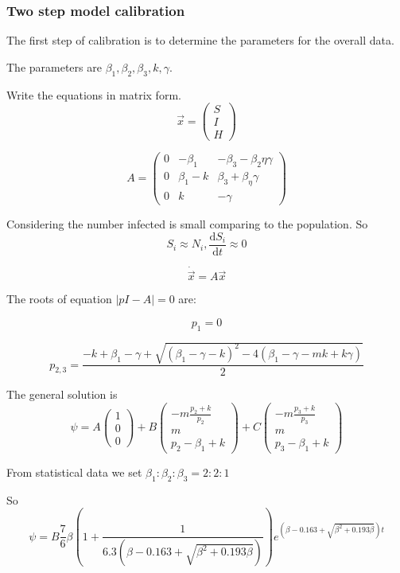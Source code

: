 \documentclass[11pt]{article}
\begin{document}
\subsubsection{Two step model calibration}
The first step of calibration is to determine the parameters for the overall data.

The parameters are $\beta_1,\beta_2,\beta_3, k,\gamma$.

Write the equations in matrix form.
$$\vec{x} =  \begin{pmatrix}
S\\I\\H
 \end{pmatrix}$$ 
 
 $$
 A =  \begin{pmatrix}
0 &-\beta_1 & -\beta_3-\beta_2\eta\gamma \\
0 &\beta_1 -k & \beta_3 + \beta_\eta\gamma \\
0 & k & -\gamma 
 \end{pmatrix}
 $$
 
 Considering the number infected is small comparing to the population. So $$S_i \approx N_i, \frac{\mathrm{d}S_i}{\mathrm{d}t} \approx 0$$
 
 $$\dot{\vec{x}} =  A  \vec{x}$$
 
 The roots of equation $|pI-A| = 0$ are:
 
 $$
 p_1 = 0
 $$
 
 $$
 p_{2,3} = \frac{-k+\beta_1 - \gamma + \sqrt{  (\beta_1 - \gamma - k)^2  - 4(\beta_1 - \gamma - mk + k\gamma) } }{2}
 $$
 
 
 The general solution is 
$$\psi = A\begin{pmatrix}
1\\0\\0
 \end{pmatrix}
 +B\begin{pmatrix}
-m\frac{p_2 + k}{p_2}\\ m \\ p_2 - \beta_1 + k
 \end{pmatrix}
 +C\begin{pmatrix}
-m\frac{p_3 + k}{p_3}\\ m \\ p_3- \beta_1 + k
 \end{pmatrix}
$$


From statistical data we set $\beta_1:\beta_2:\beta_3 = 2:2:1$
 
So $$\psi = B\frac{7}{6}\beta(1+\frac{1}{6.3(\beta - 0.163+\sqrt{\beta^2 + 0.193\beta})}) e^{(\beta - 0.163+\sqrt{\beta^2 + 0.193\beta})t}$$
 
\end{document}
